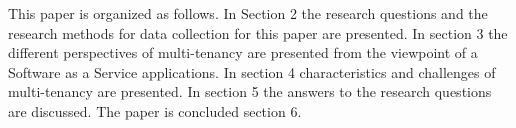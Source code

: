 \documentclass[conference]{sasmoota2017}
\begin{document}
This paper is organized as follows. In Section 2 the research questions and the research methods for data collection for this paper are presented. In section 3 the different perspectives of multi-tenancy are presented from the viewpoint of a Software as a Service applications. In section 4 characteristics and challenges of multi-tenancy are presented. In section 5 the answers to the research questions are discussed. The paper is concluded section 6. 






% 
%
%
%


%
%
\end{document}

